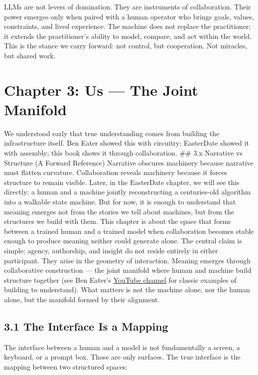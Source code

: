 LLMs are not levers of domination. They are instruments of
collaboration. Their power emerges only when paired with a human
operator who brings goals, values, constraints, and lived experience.
The machine does not replace the practitioner; it extends the
practitioner's ability to model, compare, and act within the world. This
is the stance we carry forward: not control, but cooperation. Not
miracles, but shared work.

\hypertarget{chapter-3-us-the-joint-manifold}{%
\section{Chapter 3: Us --- The Joint
Manifold}\label{chapter-3-us-the-joint-manifold}}

We understood early that true understanding comes from building the
infrastructure itself. Ben Eater showed this with circuitry; EasterDate
showed it with assembly; this book shows it through collaboration. \#\#
3.x Narrative vs Structure (A Forward Reference) Narrative obscures
machinery because narrative must flatten curvature. Collaboration
reveals machinery because it forces structure to remain visible. Later,
in the EasterDate chapter, we will see this directly: a human and a
machine jointly reconstructing a centuries-old algorithm into a walkable
state machine. But for now, it is enough to understand that meaning
emerges not from the stories we tell about machines, but from the
structures we build with them. This chapter is about the space that
forms between a trained human and a trained model when collaboration
becomes stable enough to produce meaning neither could generate alone.
The central claim is simple: agency, authorship, and insight do not
reside entirely in either participant. They arise in the geometry of
interaction. Meaning emerges through collaborative construction --- the
joint manifold where human and machine build structure together (see Ben
Eater's \href{https://www.youtube.com/user/eaterbc}{YouTube channel} for
classic examples of building to understand). What matters is not the
machine alone, nor the human alone, but the manifold formed by their
alignment.

\hypertarget{the-interface-is-a-mapping}{%
\subsection{3.1 The Interface Is a
Mapping}\label{the-interface-is-a-mapping}}

The interface between a human and a model is not fundamentally a screen,
a keyboard, or a prompt box. Those are only surfaces. The true interface
is the mapping between two structured spaces:

